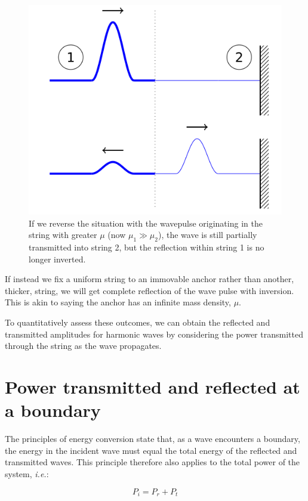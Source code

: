 \documentclass[
]{book}
\begin{document}
\begin{figure}

{\centering \includegraphics[width=0.7\linewidth]{visualisations/LaTeX/ch8-wavesonstrings2} 

}

\caption{If we reverse the situation with the wavepulse originating in the string with greater $\mu$ (now $\mu_1 \gg \mu_2$), the wave is still partially transmitted into string 2, but the reflection within string 1 is no longer inverted.}\label{fig:ch8-thickthininversion1b}
\end{figure}

If instead we fix a uniform string to an immovable anchor rather than another, thicker, string, we will get complete reflection of the wave pulse with inversion. This is akin to saying the anchor has an infinite mass density, \(\mu\).

To quantitatively assess these outcomes, we can obtain the reflected and transmitted amplitudes for harmonic waves by considering the power transmitted through the string as the wave propagates.

\hypertarget{sec-ch8-powertransmittedreflected}{%
\section{Power transmitted and reflected at a boundary}\label{sec-ch8-powertransmittedreflected}}

The principles of energy conversion state that, as a wave encounters a boundary, the energy in the incident wave must equal the total energy of the reflected and transmitted waves. This principle therefore also applies to the total power of the system, \emph{i.e.}:

\begin{equation}
P_i = P_r + P_t
\label{eq:ch8-powerconservation1}
\end{equation}
\end{document}

